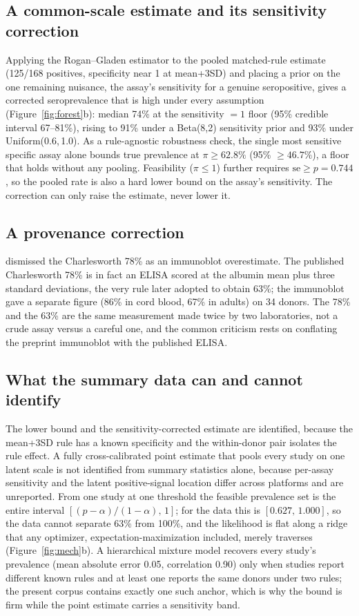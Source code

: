 \documentclass[11pt]{article}
\begin{document}
\subsection{A common-scale estimate and its sensitivity correction}
Applying the Rogan--Gladen estimator to the pooled matched-rule estimate (125/168 positives, specificity near 1 at mean+3SD) and placing a prior on the one remaining nuisance, the assay's sensitivity for a genuine seropositive, gives a corrected seroprevalence that is high under every assumption (Figure~\ref{fig:forest}b): median 74\% at the sensitivity $=1$ floor (95\% credible interval 67--81\%), rising to 91\% under a Beta(8,2) sensitivity prior and 93\% under Uniform(0.6,\,1.0). As a rule-agnostic robustness check, the single most sensitive specific assay \citep{simhadri2026} alone bounds true prevalence at $\pi \ge 62.8\%$ (95\% $\ge 46.7\%$), a floor that holds without any pooling. Feasibility ($\pi \le 1$) further requires $\mathrm{se} \ge p = 0.744$, so the pooled rate is also a hard lower bound on the assay's sensitivity. The correction can only raise the estimate, never lower it.

\subsection{A provenance correction}
\citet{simhadri2018} dismissed the Charlesworth 78\% as an immunoblot overestimate. The published Charlesworth 78\% is in fact an ELISA scored at the albumin mean plus three standard deviations, the very rule \citet{simhadri2026} later adopted to obtain 63\%; the immunoblot gave a separate figure (86\% in cord blood, 67\% in adults) on 34 donors. The 78\% and the 63\% are the same measurement made twice by two laboratories, not a crude assay versus a careful one, and the common criticism rests on conflating the preprint immunoblot with the published ELISA.

\subsection{What the summary data can and cannot identify}
The lower bound and the sensitivity-corrected estimate are identified, because the mean+3SD rule has a known specificity and the within-donor pair isolates the rule effect. A fully cross-calibrated point estimate that pools every study on one latent scale is not identified from summary statistics alone, because per-assay sensitivity and the latent positive-signal location differ across platforms and are unreported. From one study at one threshold the feasible prevalence set is the entire interval $[(p-\alpha)/(1-\alpha),\,1]$; for the \citet{simhadri2026} data this is $[0.627,\,1.000]$, so the data cannot separate 63\% from 100\%, and the likelihood is flat along a ridge that any optimizer, expectation-maximization included, merely traverses (Figure~\ref{fig:mech}b). A hierarchical mixture model recovers every study's prevalence (mean absolute error 0.05, correlation 0.90) only when studies report different known rules and at least one reports the same donors under two rules; the present corpus contains exactly one such anchor, which is why the bound is firm while the point estimate carries a sensitivity band.
\end{document}
